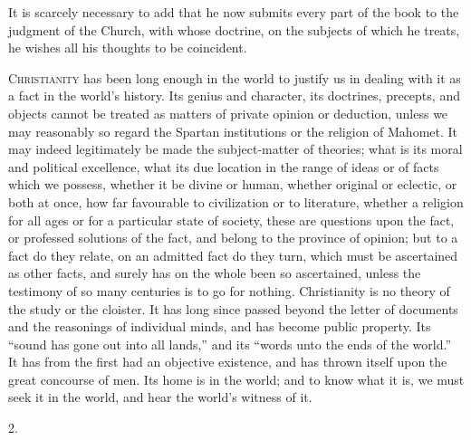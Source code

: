 It is scarcely necessary to add that he now submits
every part of the book to the judgment of the Church,
with whose doctrine, on the subjects of which he treats,
he wishes all his thoughts to be coincident.


C\textsc{hristianity} has been long enough in the world to
justify us in dealing with it as a fact in the world's
history. Its genius and character, its doctrines,
precepts, and objects cannot be treated as matters of
private opinion or deduction, unless we may reasonably so
regard the Spartan institutions or the religion of
Mahomet. It may indeed legitimately be made the
subject-matter of theories; what is its moral and
political excellence, what its due location in the range
of ideas or of facts which we possess, whether it be
divine or human, whether original or eclectic, or both at
once, how far favourable to civilization or to
literature, whether a religion for all ages or for a
particular state of society, these are questions upon the
fact, or professed solutions of the fact, and belong to
the province of opinion; but to a fact do they relate, on
an admitted fact do they turn, which must be ascertained
as other facts, and surely has on the whole been so
ascertained, unless the testimony of so many centuries is
to go for nothing. Christianity is no theory of the study
or the cloister. It has long since passed beyond the
letter of documents and the reasonings of individual
minds, and has become public property. Its ``sound
has gone out into all lands,'' and its ``words
unto the ends of the world.'' It has from the first
had an objective existence, and has thrown itself upon
the great concourse of men. Its home is in the world; and
to know what it is, we must seek it in the world, and
hear the world's witness of it.

2.

